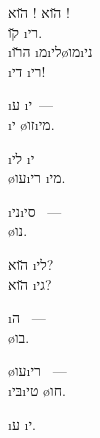 \begin{twocol}
\begin{stanza}
 \u{הוא} !  \u{הוא} !\\
\u{קו} \i{רי}.\\
\i{ה}\u{רו} \i{מ}\i{לי}\o{מו}\i{ני}\\
\i{די} \i{רי}!
\end{stanza}
\end{twocol}




\begin{twocol}
\begin{stanza}
 \i{ע} \i{י}~—\\
\i{י} \o{זו}\i{מי}.
\end{stanza}

\begin{stanza}
\i{לי}  \i{י}\\
\o{עו}\i{רי} \i{מי}.
\end{stanza}

\begin{stanza}
\i{ני}\i{סי} ~—\\
 \o{נו}.
\end{stanza}

\begin{stanza}
 \u{הוא} \i{לי}?\\
 \u{הוא} \i{גי}?
\end{stanza}

\begin{stanza}
\i{ה}  ~—\\
 \o{בו}.
\end{stanza}

\begin{stanza}
\o{עו}\i{רי} ~—\\
\i{בּי}\i{טי} \o{חו}.
\end{stanza}

\begin{stanza}
 \i{ע} \i{י}.
\end{stanza}
\end{twocol}



